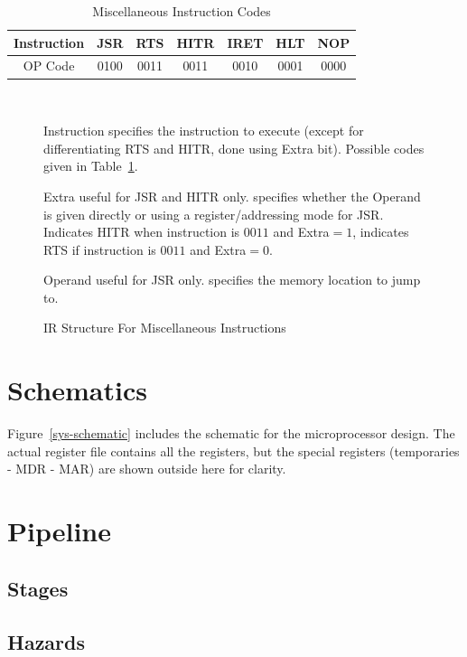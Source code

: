 \documentclass[12pt]{article}
\theoremstyle{plain}
\theoremstyle{definition}
\begin{document}
    \begin{table}[H]
        \centering
        \begin{tabular}{|c|c|c|c|c|c|c|}
            \hline
            Instruction & JSR  & RTS  & HITR  & IRET  & HLT  & NOP  \\ \hline
            OP Code     & 0100 & 0011 & 0011 & 0010 & 0001 & 0000 \\ \hline
        \end{tabular}
        \caption{Miscellaneous Instruction Codes}
        \label{misc-op-codes}
    \end{table}
    \begin{figure}[H]
        \centering
        \caption{IR Structure For Miscellaneous Instructions}
        \label{IR-Misc}
        \vspace{0.5 cm}
         \\
        \vspace{0.5 cm}
        \begin{regdesc}\begin{reglist}            
            \item [Instruction] specifies the instruction to execute (except for differentiating RTS and HITR, done using Extra bit). Possible codes given in Table~\ref{misc-op-codes}.
            \item [Extra] useful for JSR and HITR only. specifies whether the Operand is given directly or using a register/addressing mode for JSR. Indicates HITR when instruction is $0011$ and Extra$=1$, indicates RTS if instruction is $0011$ and Extra$=0$. 
            \item [Operand] useful for JSR only. specifies the memory location to jump  to.
        \end{reglist}\end{regdesc}
    \end{figure}
\pagebreak

\section{Schematics}
    Figure~\ref{sys-schematic} includes the schematic for the microprocessor design. The actual register file contains all the registers, but the special registers (temporaries - MDR - MAR) are shown outside here for clarity.

\pagebreak

\section{Pipeline}
\subsection{Stages}
\subsection{Hazards}


			
\end{document}
